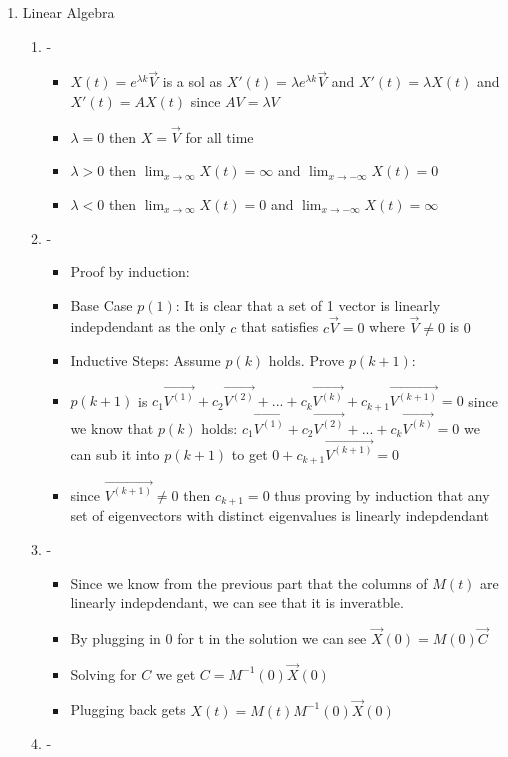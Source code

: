 \documentclass{article}
\begin{document}
\begin{enumerate}
\begin{enumerate}
    \end{enumerate}
    \item Linear Algebra \begin{enumerate}
        \item - \begin{itemize}
            \item $X(t) = e^{\lambda k} \vec{V}$ is a sol as $X'(t) = \lambda e^{\lambda k} \vec{V} $ and $X'(t) = \lambda X(t)$ and $X'(t) = A X(t)$ since $AV = \lambda V$ 
            \item $\lambda = 0$ then $X = \vec{V}$ for all time
            \item $\lambda > 0$ then $\lim_{x \rightarrow \infty} X(t) = \infty$ and $\lim_{x \rightarrow -\infty} X(t) = 0$ 
            \item $\lambda < 0$ then $\lim_{x \rightarrow \infty} X(t) = 0$ and $\lim_{x \rightarrow -\infty} X(t) = \infty$ 
        \end{itemize}
       \item - \begin{itemize}
            \item Proof by induction: 
            \item Base Case $p(1)$: It is clear that a set of 1 vector is linearly indepdendant as the only $c$ that satisfies $c\vec{V} =0 $ where $\vec{V} \neq 0$ is $0$
            \item Inductive Steps: Assume $p(k)$ holds. Prove $p(k+1)$:
            \item $p(k+1)$ is $c_1 \vec{V^{(1)}} + c_2 \vec{V^{(2)}} + ... +c_k \vec{V^{(k)}} + c_{k+1} \vec{V^{(k+1)}} = 0 $ since we know that $p(k)$ holds: $ c_1 \vec{V^{(1)}} + c_2 \vec{V^{(2)}} + ... +c_k \vec{V^{(k)}} = 0 $  we can sub it into $p(k+1)$ to get $ 0 + c_{k+1} \vec{V^{(k+1)}} = 0$ 
            \item since $\vec{V^{(k+1)}} \neq 0$ then $c_{k+1} = 0$ thus proving by induction that any set of eigenvectors with distinct eigenvalues is linearly indepdendant
        \end{itemize}
        \item - \begin{itemize}
            \item Since we know from the previous part that the columns of $M(t)$ are linearly indepdendant, we can see that it is inveratble. 
            \item By plugging in 0 for t in the solution we can see $\vec{X}(0) =  M(0)\vec{C}$ 
            \item Solving for $C$ we get $C = M^{-1}(0)\vec{X}(0)$
            \item Plugging back gets $X(t) = M(t)M^{-1}(0)\vec{X}(0)$ 
        \end{itemize}
        \item - 
    \end{enumerate}
\end{enumerate}
\end{document}
